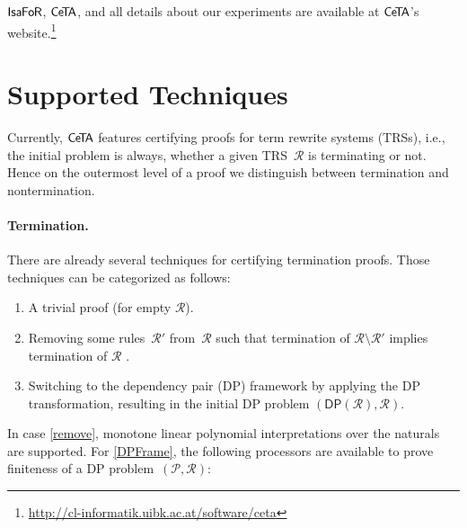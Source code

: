 \documentclass[a4paper,final]{easychair}
\theoremstyle{definition}
\newcommand\formatID[1]{\ensuremath{{\sf#1}}}
\newcommand\CeTA{\formatID{C\kern-0.10exe\kern-0.40exT\kern-0.40exA}}
\newcommand\IsaFoR{\formatID{Isa\kern-0.10exF\kern-0.10exo\kern-0.10exR}}
\newcommand\DP{\mathsf{DP}}
\newcommand\RR{\mathcal{R}}
\newcommand\PP{\mathcal{P}}
\begin{document}
\IsaFoR{}, \CeTA{}, and all details about our experiments are
available at
\CeTA's website.\footnote{\url{http://cl-informatik.uibk.ac.at/software/ceta}}

\section{Supported Techniques}
\label{sec:techniques}
Currently, \CeTA{} features certifying proofs for term rewrite systems (TRSs),
i.e., the initial problem is always, whether a given TRS~$\RR$ is terminating or
not. Hence on the outermost level of a proof we distinguish between termination
and nontermination. 

\paragraph{Termination.}
There are already several techniques for certifying termination proofs. Those
techniques can be categorized as follows:
\begin{enumerate}
  \item A trivial proof (for empty $\RR$).
  \item\label{remove} Removing some rules~$\RR'$ from~$\RR$ such that
    termination of $\RR\setminus\RR'$ implies termination of $\RR$ \cite{RTA04}.    
  \item\label{DPFrame} Switching to the dependency pair (DP) framework 
  by applying the DP transformation, resulting in the initial
  DP problem $(\DP(\RR),\RR)$.
\end{enumerate}
In case \ref{remove}, monotone linear polynomial interpretations over the
naturals are supported. For \ref{DPFrame}, the following processors are available
to prove finiteness of a DP problem~$(\PP,\RR)$:
\end{document}

